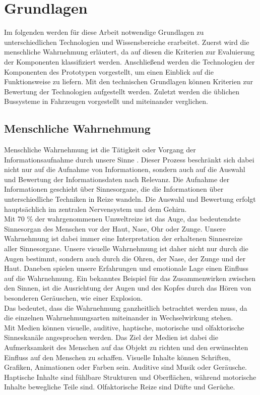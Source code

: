 \chapter{Grundlagen}
\label{cha:Grundlagen}
Im folgenden werden für diese Arbeit notwendige Grundlagen zu unterschiedlichen Technologien und Wissensbereiche erarbeitet. 
Zuerst wird die menschliche Wahrnehmung erläutert, da auf diesen die Kriterien zur Evaluierung der Komponenten klassifiziert werden. Anschließend werden die Technologien der Komponenten des Prototypen vorgestellt, um einen Einblick auf die Funktionsweise zu liefern. Mit den technischen Grundlagen können Kriterien zur Bewertung der Technologien aufgestellt werden. Zuletzt werden die üblichen Bussysteme in Fahrzeugen vorgestellt und miteinander verglichen.
\section{Menschliche Wahrnehmung}
Menschliche Wahrnehmung ist die \glqq Tätigkeit oder Vorgang der Informationsaufnahme durch unsere Sinne\grqq{} \cite[Seite 12]{Buhler.2017}. Dieser Prozess beschränkt sich dabei nicht nur auf die Aufnahme von Informationen, sondern auch auf die Auswahl und Bewertung der Informationsdaten nach Relevanz. Die Aufnahme der Informationen geschieht über Sinnesorgane, die die Informationen über unterschiedliche Techniken in Reize wandeln. Die Auswahl und Bewertung erfolgt hauptsächlich im zentralen Nervensystem und dem Gehirn. \cite[Vgl. Seite 12]{Buhler.2017}\\
Mit 70 \% der wahrgenommenen Umweltreize ist das Auge, das bedeutendste Sinnesorgan des Menschen vor der Haut, Nase, Ohr oder Zunge. Unsere Wahrnehmung ist dabei immer eine Interpretation der erhaltenen Sinnesreize aller Sinnesorgane. Unsere visuelle Wahrnehmung ist daher nicht nur durch die Augen bestimmt, sondern auch durch die Ohren, der Nase, der Zunge und der Haut. Daneben spielen unsere Erfahrungen und emotionale Lage einen Einfluss auf die Wahrnehmung. \cite[Vgl. Seite 13 f.]{Buhler.2017}
Ein bekanntes Beispiel für das Zusammenwirken zwischen den Sinnen, ist die Ausrichtung der Augen und des Kopfes durch das Hören von besonderen Geräuschen, wie einer Explosion.\\
Das bedeutet, dass die Wahrnehmung ganzheitlich betrachtet werden muss, da die einzelnen Wahrnehmungsarten miteinander in Wechselwirkung stehen. \\
Mit Medien können visuelle, auditive, haptische, motorische und olfaktorische Sinneskanäle angesprochen werden. Das Ziel der Medien ist dabei die Aufmerksamkeit des Menschen auf das Objekt zu richten und den erwünschten Einfluss auf den Menschen zu schaffen. Visuelle Inhalte können Schriften, Grafiken, Animationen oder Farben sein. Auditive sind Musik oder Geräusche. Haptische Inhalte sind fühlbare Strukturen und Oberflächen, während motorische Inhalte bewegliche Teile sind. Olfaktorische Reize sind Düfte und Gerüche. \cite[Vgl. Seite 3]{Buhler.2017}\\
